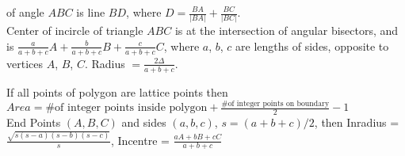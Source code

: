  of angle $ABC$ is line $BD$, where $D = \frac{BA}{|BA|} + \frac{BC}{|BC|}$. \\
Center of incircle of triangle $ABC$ is at the intersection of angular
bisectors, and is $\frac{a}{a+b+c} A + \frac{b}{a+b+c} B + \frac{c}{a+b+c} C$,
where $a$, $b$, $c$ are lengths of sides, opposite to vertices $A$, $B$, $C$.
Radius $= \frac{2\Delta}{a+b+c}$.
 
 If all points of polygon are lattice points then $Area = \text{\# of integer points inside polygon} + \frac{\text{\# of integer points on boundary}}{2} -1$ \\
 End Points $(A,B,C)$ and sides $(a,b,c)$, $s=(a+b+c)/2$, then Inradius = $\frac{\sqrt{s(s-a)(s-b)(s-c)}}{s}$, Incentre = $\frac{aA+bB+cC}{a+b+c}$ \\